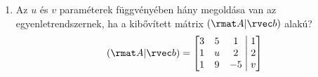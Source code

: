 \documentclass[a4paper, 12pt]{scrartcl}
\begin{document}
\begin{enumerate}
  \item Az $u$ és $v$ paraméterek függvényében hány megoldása van az
        egyenletrendszernek, ha a kibővített mátrix $(\rmat A | \rvec b)$ alakú?
        $$
          (\rmat A | \rvec b) =
          \left[
            \begin{matrix}
              3 & 5 & 1  \\
              1 & u & 2  \\
              1 & 9 & -5 \\
            \end{matrix}
            \;\middle|\;
            \begin{matrix}
              1 \\
              2 \\
              v \\
            \end{matrix}
          \right]
        $$
\end{enumerate}
\end{document}
